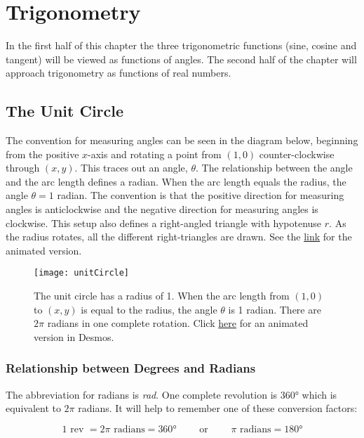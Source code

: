 \chapter{Trigonometry}

In the first half of this chapter the three trigonometric functions (sine, cosine and tangent) will be viewed as functions of angles. The second half of the chapter will approach trigonometry as functions of real numbers.

\section{The Unit Circle}
The convention for measuring angles can be seen in the diagram below, beginning from the positive $x$-axis and rotating a point from $(1,0)$ counter-clockwise through $(x,y)$. This traces out an angle, $\theta$. The relationship between the angle and the arc length defines a radian. When the arc length equals the radius, the angle $\theta=1$ radian. The convention is that the positive direction for measuring angles is anticlockwise and the negative direction for measuring angles is clockwise. This setup also defines a right-angled triangle with hypotenuse $r$. As the radius rotates, all the different right-triangles are drawn. See the \href{https://www.desmos.com/calculator/4t6zc5eucd}{link} for the animated version.

\begin{figure}[h]
	\begin{center}
		\texttt{[image: unitCircle]}
		\caption{The unit circle has a radius of 1. When the arc length from $(1,0)$ to $(x,y)$ is equal to the radius, the angle $\theta$ is 1 radian. There are $2\pi$ radians in one complete rotation. Click \href{https://www.desmos.com/calculator/4t6zc5eucd}{here} for an animated version in Desmos.}
		\label{fig:unitCircle}
	\end{center}
\end{figure}

\subsection*{Relationship between Degrees and Radians}
The abbreviation for radians is \textit{rad}. One complete revolution is \ang{360} which is equivalent to $2 \pi $ radians. It will help to remember one of these conversion factors:
\begin{tcolorbox}\[1\text{ rev }=2\pi \text{ radians} =  \ang{360} \qquad\text{ or }\qquad\pi \text{ radians} =  \ang{180}\]
\end{tcolorbox}

